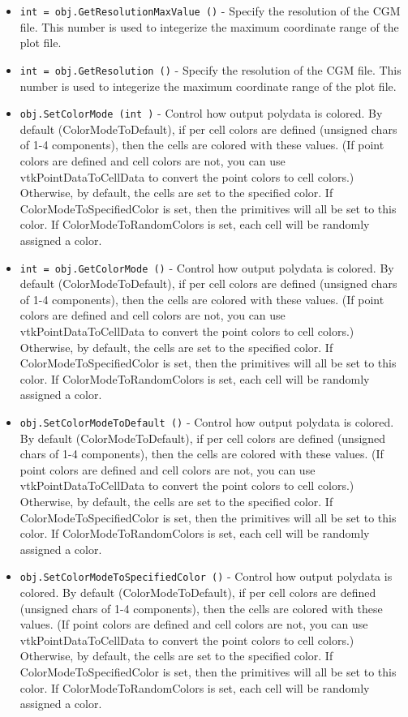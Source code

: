 \begin{itemize}
\item  \verb|int = obj.GetResolutionMaxValue ()| -  Specify the resolution of the CGM file. This number is used to integerize
 the maximum coordinate range of the plot file.

\item  \verb|int = obj.GetResolution ()| -  Specify the resolution of the CGM file. This number is used to integerize
 the maximum coordinate range of the plot file.

\item  \verb|obj.SetColorMode (int )| -  Control how output polydata is colored. By default (ColorModeToDefault),
 if per cell colors are defined (unsigned chars of 1-4 components), then
 the cells are colored with these values. (If point colors are defined
 and cell colors are not, you can use vtkPointDataToCellData to convert
 the point colors to cell colors.) Otherwise, by default, the cells are
 set to the specified color. If ColorModeToSpecifiedColor is set, then
 the primitives will all be set to this color. If ColorModeToRandomColors
 is set, each cell will be randomly assigned a color.

\item  \verb|int = obj.GetColorMode ()| -  Control how output polydata is colored. By default (ColorModeToDefault),
 if per cell colors are defined (unsigned chars of 1-4 components), then
 the cells are colored with these values. (If point colors are defined
 and cell colors are not, you can use vtkPointDataToCellData to convert
 the point colors to cell colors.) Otherwise, by default, the cells are
 set to the specified color. If ColorModeToSpecifiedColor is set, then
 the primitives will all be set to this color. If ColorModeToRandomColors
 is set, each cell will be randomly assigned a color.

\item  \verb|obj.SetColorModeToDefault ()| -  Control how output polydata is colored. By default (ColorModeToDefault),
 if per cell colors are defined (unsigned chars of 1-4 components), then
 the cells are colored with these values. (If point colors are defined
 and cell colors are not, you can use vtkPointDataToCellData to convert
 the point colors to cell colors.) Otherwise, by default, the cells are
 set to the specified color. If ColorModeToSpecifiedColor is set, then
 the primitives will all be set to this color. If ColorModeToRandomColors
 is set, each cell will be randomly assigned a color.

\item  \verb|obj.SetColorModeToSpecifiedColor ()| -  Control how output polydata is colored. By default (ColorModeToDefault),
 if per cell colors are defined (unsigned chars of 1-4 components), then
 the cells are colored with these values. (If point colors are defined
 and cell colors are not, you can use vtkPointDataToCellData to convert
 the point colors to cell colors.) Otherwise, by default, the cells are
 set to the specified color. If ColorModeToSpecifiedColor is set, then
 the primitives will all be set to this color. If ColorModeToRandomColors
 is set, each cell will be randomly assigned a color.


\end{itemize}
